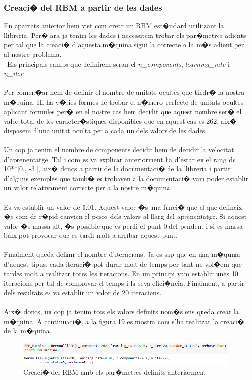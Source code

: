 \documentclass[12pt,a4paper,openright,oneside]{article}
\numberwithin{equation}{section}
\theoremstyle{definition}
\begin{document}
\subsubsection{Creaci� del RBM a partir de les dades}
En apartats anterior hem vist com crear un RBM est�ndard utilitzant la llibreria. Per� ara ja tenim les dades i necessitem trobar els par�metres adients per tal que la creaci� d'aquesta m�quina sigui la correcte o la m�s adient per al nostre problema. \\\
Els principals camps que definirem seran el \textit{n\_components}, \textit{learning\_rate} i \textit{n\_iter}.\\\\
Per comen�ar hem de definir el nombre de unitats ocultes que tindr� la nostra m�quina. Hi ha v�ries formes de trobar el n�mero perfecte de unitats ocultes aplicant formules per� en el nostre cas hem decidit que aquest nombre ser� el valor total de les caracter�stiques disponibles que en aquest cas es 262, aix� disposem d'una unitat oculta per a cada un dels valors de les dades. \\\\
Un cop ja tenim el nombre de components decidit hem de decidir la velocitat d'aprenentatge. Tal i com es va explicar anteriorment ha d'estar en el rang de 10**[0., -3.], aix� doncs a partir de la documentaci� de la llibreria \cite{sklearnRBM} i partir d'alguns exemples que tamb� es trobaven a la documentaci� vam poder establir un valor relativament correcte per a la nostre m�quina.\\\\
 Es va establir un valor de 0.01. Aquest valor �s una funci� que el que defineix �s com de r�pid canvien el pesos dels valors al llarg del aprenentatge. Si aquest valor �s massa alt, �s possible que es perdi el punt 0 del pendent i si es massa baix pot provocar que es tardi molt a arribar aquest punt.\\\\
 Finalment queda definir el nombre d'iteracions. Ja es sap que en una m�quina d'aquest tipus, cada iteraci� pot durar molt de temps per tant no vol�em que tardes molt a realitzar totes les iteracions. En un principi vam establir unes 10 iteracions per tal de comprovar el temps i la seva efici�ncia. Finalment, a partir dels resultats es va establir un valor de 20 iteracions.\\\\
 Aix� doncs, un cop ja tenim tots els valors definits nom�s ens queda crear la m�quina. A continuaci�, a la figura 19 es mostra com s'ha realitzat la creaci� de la m�quina.
 \begin{figure}[h!]
\begin{center}
\includegraphics[width=\textwidth]{rbm}
\caption{Creaci� del RBM amb els par�metres definits anteriorment}
\end{center}
\end{figure}
\end{document}

